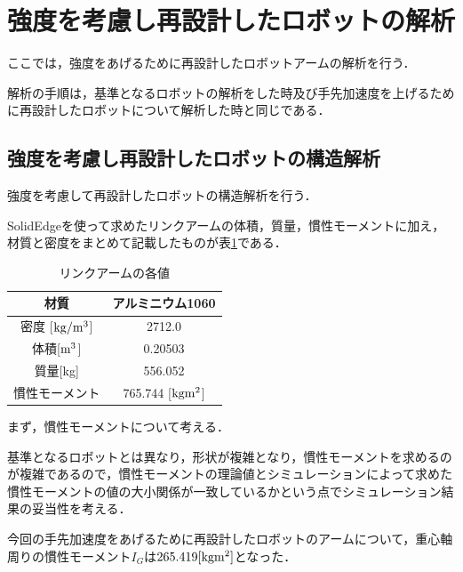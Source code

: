 \section{強度を考慮し再設計したロボットの解析}\label{ux5f37ux5ea6ux3092ux8003ux616eux3057ux518dux8a2dux8a08ux3057ux305fux30edux30dcux30c3ux30c8ux306eux89e3ux6790}

ここでは，強度をあげるために再設計したロボットアームの解析を行う．

解析の手順は，基準となるロボットの解析をした時及び手先加速度を上げるために再設計したロボットについて解析した時と同じである．

\subsection{強度を考慮し再設計したロボットの構造解析}\label{ux5f37ux5ea6ux3092ux8003ux616eux3057ux518dux8a2dux8a08ux3057ux305fux30edux30dcux30c3ux30c8ux306eux69cbux9020ux89e3ux6790}

強度を考慮して再設計したロボットの構造解析を行う．

SolidEdgeを使って求めたリンクアームの体積，質量，慣性モーメントに加え，材質と密度をまとめて記載したものが表\ref{strong-robot-data}である．

\begin{table}[htb]
\caption[]{リンクアームの各値}
  \begin{center}
    \begin{tabular}{|c|c|} \hline
      材質 & アルミニウム1060 \\ \hline
      密度 [$\rm kg/m^3$]& 2712.0 \\ \hline
      体積[$\rm m^3$] & 0.20503 \\ \hline
      質量[kg] & 556.052 \\ \hline
      慣性モーメント & 765.744 [$\rm kg m^2$] \\ \hline
    \end{tabular}
    \label{strong-robot-data}
  \end{center}
\end{table}

まず，慣性モーメントについて考える．

基準となるロボットとは異なり，形状が複雑となり，慣性モーメントを求めるのが複雑であるので，慣性モーメントの理論値とシミュレーションによって求めた慣性モーメントの値の大小関係が一致しているかという点でシミュレーション結果の妥当性を考える．

今回の手先加速度をあげるために再設計したロボットのアームについて，重心軸周りの慣性モーメント\(I_G\)は\(265.419[\rm kgm^2]\)となった．

